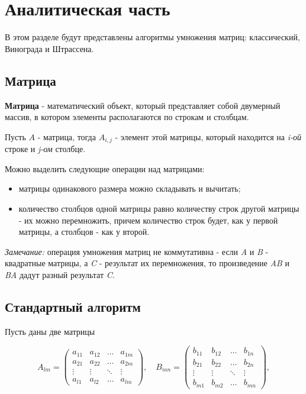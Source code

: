 \chapter{Аналитическая часть}
В этом разделе будут представлены алгоритмы умножения матриц: классический, Винограда и Штрассена.


\section{Матрица}

\textbf{Матрица} - математический объект, который представляет собой двумерный массив, в котором элементы располагаются по строкам и столбцам\cite{matrix}.

Пусть $A$ - матрица, тогда $A_{i,j}$ - элемент этой матрицы, который находится на \textit{i-ой} строке и \textit{j-ом} столбце.

Можно выделить следующие операции над матрицами:
\begin{itemize}
    \item матрицы одинакового размера можно складывать и вычитать;
    \item количество столбцов одной матрицы равно количеству строк другой матрицы - их можно перемножить, причем количество строк будет, как у первой матрицы, а столбцов - как у второй. \newline
\end{itemize}

\textit{Замечание:} операция умножения матриц не коммутативна - если \textit{A} и \textit{B} - квадратные матрицы, а \textit{C} - результат их перемножения, то произведение \textit{AB} и \textit{BA} дадут разный результат \textit{C}.


\section{Стандартный алгоритм}

Пусть даны две матрицы

\begin{equation}
	A_{lm} = \begin{pmatrix}
		a_{11} & a_{12} & \ldots & a_{1m}\\
		a_{21} & a_{22} & \ldots & a_{2m}\\
		\vdots & \vdots & \ddots & \vdots\\
		a_{l1} & a_{l2} & \ldots & a_{lm}
	\end{pmatrix},
	\quad
	B_{mn} = \begin{pmatrix}
		b_{11} & b_{12} & \ldots & b_{1n}\\
		b_{21} & b_{22} & \ldots & b_{2n}\\
		\vdots & \vdots & \ddots & \vdots\\
		b_{m1} & b_{m2} & \ldots & b_{mn}
	\end{pmatrix},
\end{equation}

